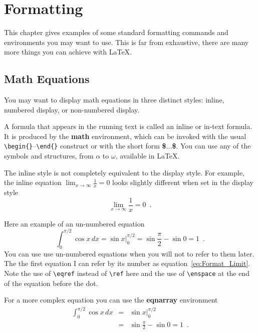
\chapter{Formatting}\label{ch:Format}

This chapter gives examples of some standard formatting commands and environments you may want to use.
This is far from exhaustive, there are many more things you can achieve with \LaTeX .

\section{Math Equations}\label{sec:Format_Math}

You may want to display math equations in three distinct styles: inline, numbered display, or non-numbered display.  

A formula that appears in the running text is called an inline or in-text formula. 
It is produced by the \textbf{math} environment, which can be invoked with the usual \verb|\begin{}|--\verb|\end{}| construct or with the short form \textbf{\$$\ldots$\$}.
You can use any of the symbols and structures, from $\alpha$ to $\omega$, available in \LaTeX .  

The inline style is not completely equivalent to the display style.
For example, the inline equation 
$\lim_{x\rightarrow \infty}\frac{1}{x}=0$
looks slightly different when set in the display style
\begin{equation}
    \lim_{x\rightarrow \infty}\frac{1}{x}=0 \enspace .
    \label{eq:Format_Limit}
\end{equation}

Here an example of an un-numbered equation
\begin{equation*}
    \int_{0}^{\pi/2} \cos x\,dx = \sin x\bigg\rvert_{0}^{\pi/2} = \sin
    \frac{\pi}{2} - \sin 0 = 1 \enspace .
\end{equation*}
You can use use un-numbered equations when you will not to refer to them later. 
The the first equation I can refer by its number as equation~\eqref{eq:Format_Limit}.
Note the use of \verb|\eqref| instead of \verb|\ref| here and the use of \verb|\enspace| at the end of the equation before the dot.

For a more complex equation you can use the \textbf{eqnarray} environment
\begin{eqnarray}\label{eq:Format_Longeq}
    \int_{0}^{\pi/2} \cos x\,dx & = & \sin x\bigg\rvert_{0}^{\pi/2} \nonumber \\
    & = & \sin\frac{\pi}{2} - \sin 0 = 1 \enspace .
\end{eqnarray}

